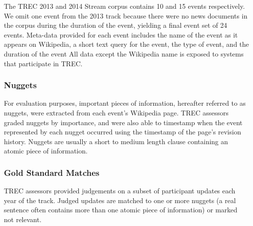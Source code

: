 The TREC 2013 and 2014 Stream corpus contains  10 and 15 events respectively. We omit
one event from the 2013 track because there were no news documents in the 
corpus during the duration of the event, yielding a final event set of 24 
events. Meta-data provided for each event includes the name of the event
as it appears on Wikipedia, a short text query for the event, 
the type of event, and the 
duration of the event
All data except the Wikipedia name is exposed to
systems that participate in TREC.

\subsubsection{Nuggets}
For evaluation purposes, important pieces of information, hereafter 
referred to as nuggets, were extracted from each event's Wikipedia page.
TREC assessors graded nuggets by importance, and were also able to timestamp
when the event represented by each nugget occurred 
using the timestamp of the page's revision history. Nuggets are 
usually a short to medium length clause containing an atomic piece of
information.

\subsubsection{Gold Standard Matches}
TREC assessors provided judgements on a subset of participant updates each year
of the track. Judged updates are matched to one or more nuggets (a real 
sentence often contains more than one atomic piece of information) or marked
not relevant.


